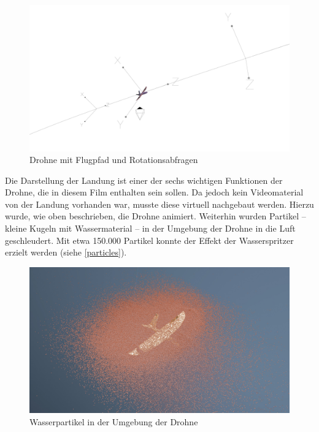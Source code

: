 \begin{figure}[H]
\begin{center}
\includegraphics[width=\textwidth]{gfx/prod/plane/an_flight.jpg}
\caption{Drohne mit Flugpfad und Rotationsabfragen}
\label{an_flight}
\end{center}
\end{figure}

Die Darstellung der Landung ist einer der sechs wichtigen Funktionen der Drohne, die in diesem Film enthalten sein sollen.
Da jedoch kein Videomaterial von der Landung vorhanden war, musste diese virtuell nachgebaut werden. Hierzu wurde, wie oben beschrieben, die Drohne animiert. Weiterhin wurden Partikel -- kleine Kugeln mit Wassermaterial -- in der Umgebung der Drohne in die Luft geschleudert. Mit etwa 150.000 Partikel konnte der Effekt der Wasserspritzer erzielt werden (siehe \autoref{particles}).

\begin{figure}[H]
\begin{center}
\includegraphics[width=\textwidth]{gfx/prod/plane/particles.jpg}
\caption{Wasserpartikel in der Umgebung der Drohne}
\label{particles}
\end{center}
\end{figure}


